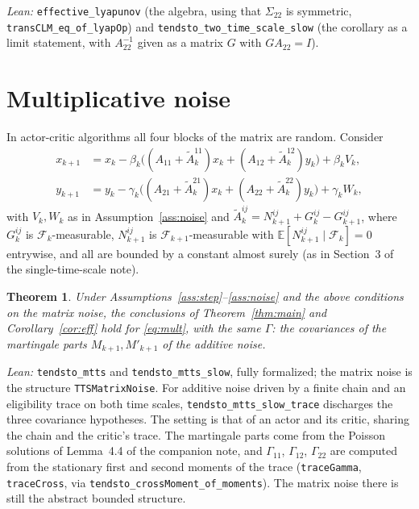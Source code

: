 \documentclass[11pt]{article}
\newtheorem{theorem}{Theorem}[section]
\theoremstyle{definition}
\theoremstyle{remark}
\newcommand{\E}{\mathbb{E}}
\newcommand{\F}{\mathcal{F}}
\begin{document}
\noindent\emph{Lean:} \texttt{effective\_lyapunov} (the algebra, using that $\Sigma_{22}$ is
symmetric, \texttt{transCLM\_eq\_of\_lyapOp}) and \texttt{tendsto\_two\_time\_scale\_slow}
(the corollary as a limit statement, with $A_{22}^{-1}$ given as a matrix $G$ with
$GA_{22} = I$).

\section{Multiplicative noise}\label{sec:mult}

In actor-critic algorithms all four blocks of the matrix are random. Consider
\begin{equation}\label{eq:mult}
\begin{aligned}
  x_{k+1} &= x_k - \beta_k\big((A_{11} + \tilde A^{11}_k)x_k + (A_{12} + \tilde A^{12}_k)y_k\big) + \beta_kV_k,\\
  y_{k+1} &= y_k - \gamma_k\big((A_{21} + \tilde A^{21}_k)x_k + (A_{22} + \tilde A^{22}_k)y_k\big) + \gamma_kW_k,
\end{aligned}
\end{equation}
with $V_k, W_k$ as in Assumption~\ref{ass:noise} and
$\tilde A^{ij}_k = N^{ij}_{k+1} + G^{ij}_k - G^{ij}_{k+1}$, where $G^{ij}_k$ is $\F_k$-measurable,
$N^{ij}_{k+1}$ is $\F_{k+1}$-measurable with $\E[N^{ij}_{k+1}\mid\F_k] = 0$ entrywise, and all are
bounded by a constant almost surely (as in Section~3 of the single-time-scale note).

\begin{theorem}\label{thm:mult}
Under Assumptions~\ref{ass:step}--\ref{ass:noise} and the above conditions on the matrix noise,
the conclusions of Theorem~\ref{thm:main} and Corollary~\ref{cor:eff} hold for \eqref{eq:mult},
with the same $\Gamma$: the covariances of the martingale parts $M_{k+1}, M'_{k+1}$ of the
additive noise.
\end{theorem}

\noindent\emph{Lean:} \texttt{tendsto\_mtts} and \texttt{tendsto\_mtts\_slow}, fully formalized;
the matrix noise is the structure \texttt{TTSMatrixNoise}. For additive noise driven by a finite
chain and an eligibility trace on both time scales, \texttt{tendsto\_mtts\_slow\_trace}
discharges the three covariance hypotheses. The setting is that of an actor and its critic,
sharing the chain and the critic's trace. The martingale parts come from the Poisson solutions
of Lemma~4.4 of the companion note, and $\Gamma_{11}$, $\Gamma_{12}$, $\Gamma_{22}$ are computed from
the stationary first and second moments of the trace (\texttt{traceGamma}, \texttt{traceCross},
via \texttt{tendsto\_crossMoment\_of\_moments}). The matrix noise there is still the abstract
bounded structure.
\end{document}
